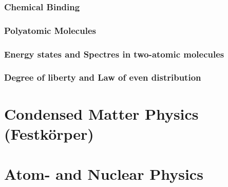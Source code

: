 \documentclass{report}
\begin{document}
\section{Chemical Binding}
\section{Polyatomic Molecules}
\section{Energy states and Spectres in two-atomic molecules}
\section{Degree of liberty and Law of even distribution}



\part{Condensed Matter Physics (Festkörper)}
\part{Atom- and Nuclear Physics}
\end{document}
